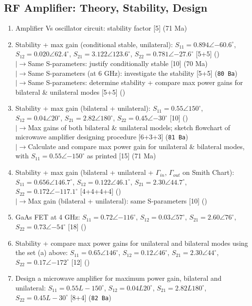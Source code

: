 \documentclass[12pt]{article}
\newcommand{\lb}{\\$\left|\rightarrow\right.$}
\begin{document}
  \subsection{RF Amplifier: Theory, Stability, Design}
    \begin{enumerate}[topsep=0pt, noitemsep]
      \item Amplifier Vs oscillator circuit: stability factor \hfill [5] (71 Ma)
      \item Stability + max gain (conditional stable, unilateral): $S_{11}{=}0.894\angle{-60.6^\circ}$, $S_{12}{=}0.020\angle62.4^\circ$, $S_{21}{=}3.122\angle123.6^\circ$, $S_{22}{=}0.781\angle{-27.6^\circ}$ \hfill [5+5] ()
        \lb Same S-parameters: justify conditionally stable \hfill [10] (70 Ma)
        \lb Same S-parameters (at 6 GHz): investigate the stability \hfill [5+5] (\texttt{80 Ba})
        \lb Same S-parameters: determine stability + compare max power gains for bilateral \& unilateral modes \hfill [5+5] ()
      \item Stability + max gain (bilateral + unilateral): $S_{11}{=}0.55\angle150^\circ$, $S_{12}{=}0.04\angle20^\circ$, $S_{21}{=}2.82\angle180^\circ$, $S_{22}{=}0.45\angle{-30^\circ}$ \hfill [10] ()
        \lb Max gains of both bilateral \& unilateral models; sketch flowchart of microwave amplifier designing procedure \hfill [6+3+3] (\texttt{81 Ba})
        \lb Calculate and compare max power gain for unilateral \& bilateral modes, with $S_{11}{=}0.55\angle{-150^\circ}$ as printed \hfill [15] (71 Ma)
      \item Stability + max gain (bilateral + unilateral + $\Gamma_{in}$, $\Gamma_{out}$ on Smith Chart): $S_{11}{=}0.656\angle146.7^\circ$, $S_{12}{=}0.122\angle46.1^\circ$, $S_{21}{=}2.30\angle44.7^\circ$, $S_{22}{=}0.172\angle{-117.1^\circ}$ \hfill [4+4+4+4] ()
        \lb Max gain (bilateral + unilateral): same S-parameters \hfill [10] ()
      \item GaAs FET at 4 GHz: $S_{11}{=}0.72\angle{-116^\circ}$, $S_{12}{=}0.03\angle57^\circ$, $S_{21}{=}2.60\angle76^\circ$, $S_{22}{=}0.73\angle{-54^\circ}$ \hfill [18] ()
      \item Stability + compare max power gains for unilateral and bilateral modes using the set (a) above: $S_{11}{=}0.65\angle146^\circ$, $S_{12}{=}0.12\angle46^\circ$, $S_{21}{=}2.30\angle44^\circ$, $S_{22}{=}0.17\angle{-172^\circ}$ \hfill [12] ()
      \item Design a microwave amplifier for maximum power gain, bilateral and unilateral: $S_{11}{=}0.55L{-}150^\circ$, $S_{12}{=}0.04L20^\circ$, $S_{21}{=}2.82L180^\circ$, $S_{22}{=}0.45L{-}30^\circ$ \hfill [8+4] (\texttt{82 Ba})

\end{enumerate}
\end{document}
